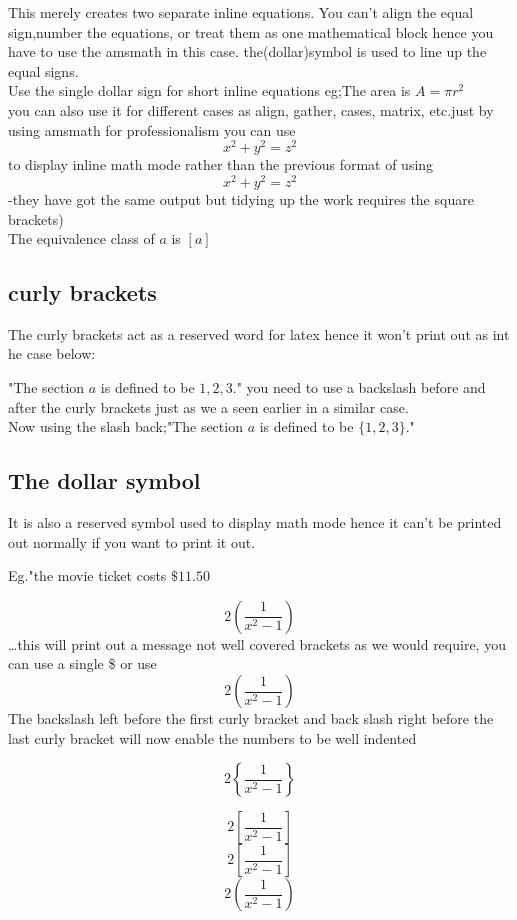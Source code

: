 \documentclass{article}
\begin{document}
  	This merely creates two separate inline equations. You can't align the equal sign,number the equations, or treat them as one mathematical block hence you have to use the amsmath in this case.
  	the(dollar)symbol is used to line up the equal signs.\\[0.2pt]
  	
  		Use the single dollar sign for short inline equations eg;The area is $A=\pi r^2$\\[1pt] 		
  		you can also use it for different cases as align, gather, cases, matrix, etc.just by using amsmath
  		for professionalism you can use \[x^2 + y^2 = z^2\] to display inline math mode rather than the previous format of using $$x^2 + y^2 = z^2$$-they have got the same output but tidying up the work requires the square brackets)\\[6pt]
  		The equivalence class of $a$ is $[a]$
  		
  		\subsection{curly brackets}
  		The curly brackets act as a reserved word for latex hence it won't print out as int he case below:
  		
  		"The section $a$ is defined to be ${1, 2, 3}$."
  		you need to use a backslash before and after the curly brackets just as we a seen earlier in a similar case.\\
  		
  		Now using the slash back;"The section $a$ is defined to be $\{1, 2, 3\}$."
  		
  		\subsection{The dollar symbol}
  		It is also a reserved symbol used to display math mode hence it can't be printed out normally if you want to print it out.
  		
  		Eg."the movie ticket costs $\$11.50$
  		
  		$$2(\frac{1}{x^2-1})$$ \ldots this will print out a message not well covered brackets as we would require, you can use a single \$ or use $$2\left(\frac{1}{x^2-1}\right)$$ 	The backslash left before the first curly bracket and back slash right before the last curly bracket will now enable the numbers to be well indented
  		
  		$$2\left\{\frac{1}{x^2-1}\right\}$$
  		
  		$$2\left[\frac{1}{x^2-1}\right]$$
  		$$2\left[\frac{1}{x^2-1}\right]$$
  		$$2\left(   \frac{1}{x^2-1}       \right)      $$
  		
\end{document}
